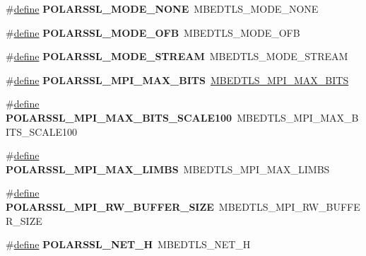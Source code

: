 \begin{DoxyCompactItemize}
\#\hyperlink{structdefine}{define} {\bfseries P\+O\+L\+A\+R\+S\+S\+L\+\_\+\+M\+O\+D\+E\+\_\+\+N\+O\+NE}~M\+B\+E\+D\+T\+L\+S\+\_\+\+M\+O\+D\+E\+\_\+\+N\+O\+NE
\item 
\mbox{\label{compat-1_83_8h_a8dc9309372cad93cb78529c10d0c58ac}} 
\#\hyperlink{structdefine}{define} {\bfseries P\+O\+L\+A\+R\+S\+S\+L\+\_\+\+M\+O\+D\+E\+\_\+\+O\+FB}~M\+B\+E\+D\+T\+L\+S\+\_\+\+M\+O\+D\+E\+\_\+\+O\+FB
\item 
\mbox{\label{compat-1_83_8h_aad99da49651dff6a53c3a75bf577209e}} 
\#\hyperlink{structdefine}{define} {\bfseries P\+O\+L\+A\+R\+S\+S\+L\+\_\+\+M\+O\+D\+E\+\_\+\+S\+T\+R\+E\+AM}~M\+B\+E\+D\+T\+L\+S\+\_\+\+M\+O\+D\+E\+\_\+\+S\+T\+R\+E\+AM
\item 
\mbox{\label{compat-1_83_8h_aca6ca30059eab25954ebb962a8b69c52}} 
\#\hyperlink{structdefine}{define} {\bfseries P\+O\+L\+A\+R\+S\+S\+L\+\_\+\+M\+P\+I\+\_\+\+M\+A\+X\+\_\+\+B\+I\+TS}~\hyperlink{bignum_8h_a134ba62182ca105e273d465861f5a4d5}{M\+B\+E\+D\+T\+L\+S\+\_\+\+M\+P\+I\+\_\+\+M\+A\+X\+\_\+\+B\+I\+TS}
\item 
\mbox{\label{compat-1_83_8h_ac2146744fdaa3abf5ee13918c2d5268b}} 
\#\hyperlink{structdefine}{define} {\bfseries P\+O\+L\+A\+R\+S\+S\+L\+\_\+\+M\+P\+I\+\_\+\+M\+A\+X\+\_\+\+B\+I\+T\+S\+\_\+\+S\+C\+A\+L\+E100}~M\+B\+E\+D\+T\+L\+S\+\_\+\+M\+P\+I\+\_\+\+M\+A\+X\+\_\+\+B\+I\+T\+S\+\_\+\+S\+C\+A\+L\+E100
\item 
\mbox{\label{compat-1_83_8h_a8ee0afd7c8a22f13aaa70d3c812e81f7}} 
\#\hyperlink{structdefine}{define} {\bfseries P\+O\+L\+A\+R\+S\+S\+L\+\_\+\+M\+P\+I\+\_\+\+M\+A\+X\+\_\+\+L\+I\+M\+BS}~M\+B\+E\+D\+T\+L\+S\+\_\+\+M\+P\+I\+\_\+\+M\+A\+X\+\_\+\+L\+I\+M\+BS
\item 
\mbox{\label{compat-1_83_8h_a728c03b4fdb0f4e9e84a5488adf1c5d0}} 
\#\hyperlink{structdefine}{define} {\bfseries P\+O\+L\+A\+R\+S\+S\+L\+\_\+\+M\+P\+I\+\_\+\+R\+W\+\_\+\+B\+U\+F\+F\+E\+R\+\_\+\+S\+I\+ZE}~M\+B\+E\+D\+T\+L\+S\+\_\+\+M\+P\+I\+\_\+\+R\+W\+\_\+\+B\+U\+F\+F\+E\+R\+\_\+\+S\+I\+ZE
\item 
\mbox{\label{compat-1_83_8h_a726691fe39b9ebdae2fc675a07dc71b0}} 
\#\hyperlink{structdefine}{define} {\bfseries P\+O\+L\+A\+R\+S\+S\+L\+\_\+\+N\+E\+T\+\_\+H}~M\+B\+E\+D\+T\+L\+S\+\_\+\+N\+E\+T\+\_\+H

\end{DoxyCompactItemize}
